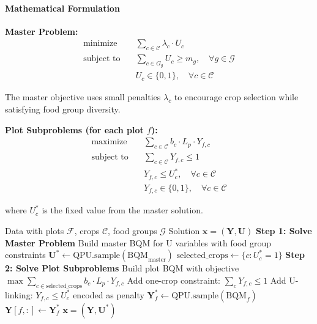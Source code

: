 \documentclass{oqireport}
\begin{document}
\paragraph{Mathematical Formulation}

\textbf{Master Problem:}
\begin{align}
\text{minimize} \quad & \sum_{c \in \mathcal{C}} \lambda_c \cdot U_c \label{eq:master_obj}\\
\text{subject to} \quad & \sum_{c \in G_g} U_c \geq m_g, \quad \forall g \in \mathcal{G} \label{eq:master_fg}\\
& U_c \in \{0,1\}, \quad \forall c \in \mathcal{C}
\end{align}

The master objective uses small penalties $\lambda_c$ to encourage crop selection while satisfying food group diversity.

\textbf{Plot Subproblems (for each plot $f$):}
\begin{align}
\text{maximize} \quad & \sum_{c \in \mathcal{C}} b_c \cdot L_p \cdot Y_{f,c} \label{eq:sub_obj}\\
\text{subject to} \quad & \sum_{c \in \mathcal{C}} Y_{f,c} \leq 1 \label{eq:sub_one_crop}\\
& Y_{f,c} \leq U_c^*, \quad \forall c \in \mathcal{C} \label{eq:sub_u_fixed}\\
& Y_{f,c} \in \{0,1\}, \quad \forall c \in \mathcal{C}
\end{align}

where $U_c^*$ is the fixed value from the master solution.

\begin{algorithm}
\caption{Coordinated Master-Subproblem Decomposition}
\begin{algorithmic}[1]
\Require Data with plots $\mathcal{F}$, crops $\mathcal{C}$, food groups $\mathcal{G}$
\Ensure Solution $\mathbf{x} = (\mathbf{Y}, \mathbf{U})$
\State \textbf{Step 1: Solve Master Problem}
\State Build master BQM for U variables with food group constraints
\State $\mathbf{U}^* \leftarrow \text{QPU.sample}(\text{BQM}_{\text{master}})$
\State $\text{selected\_crops} \leftarrow \{c : U_c^* = 1\}$
\State \textbf{Step 2: Solve Plot Subproblems}
    \State Build plot BQM with objective $\max \sum_{c \in \text{selected\_crops}} b_c \cdot L_p \cdot Y_{f,c}$
    \State Add one-crop constraint: $\sum_{c} Y_{f,c} \leq 1$
    \State Add U-linking: $Y_{f,c} \leq U_c^*$ encoded as penalty
    \State $\mathbf{Y}_f^* \leftarrow \text{QPU.sample}(\text{BQM}_f)$
    \State $\mathbf{Y}[f, :] \leftarrow \mathbf{Y}_f^*$
\EndFor
\State \Return $\mathbf{x} = (\mathbf{Y}, \mathbf{U}^*)$
\end{algorithmic}
\end{algorithm}
\end{document}
